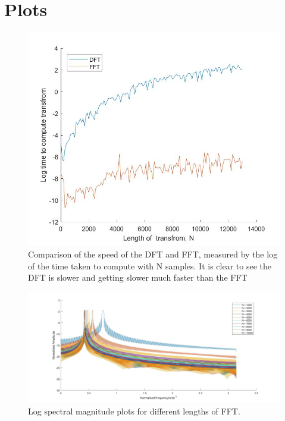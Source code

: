 \documentclass[10.9pt]{article}
\begin{document}
\appendix
\section{Plots}

\begin{figure} [H]
\centering	\includegraphics[scale = 0.4]
{DFTvFFT}
\caption{Comparison of the speed of the DFT and FFT, measured by the log of the time taken to compute with N samples. It is clear to see the DFT is slower and getting slower much faster than the FFT}
\label{DFTvFFT}
\end{figure}

\begin{figure} [H]
\centering	\includegraphics[scale = 0.3]
{Length}
\caption{Log spectral magnitude plots for different lengths of FFT.}
\label{Length}
\end{figure}
\end{document}
